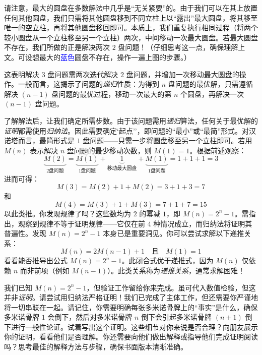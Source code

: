 \begin{center}
\end{center}

请注意，最大的圆盘在多数解法中几乎是``无关紧要''的。由于我们可以在其上放置任何其他圆盘，我们只需将其他圆盘移到不同立柱上以``露出''最大圆盘，将其移至唯一的空立柱，再将其他圆盘移回即可。本质上，我们重复执行相同过程（将两个较小圆盘从一个立柱移至另一个立柱）两次，中间移动一次最大圆盘。若最大圆盘不存在，我们所做的正是解决两次 $2$ 盘问题！（仔细思考这一点，确保理解上文。可设想最大的\textcolor{blue}{蓝色}圆盘不存在，操作一遍上图的步骤。）

这表明解决 $3$ 盘问题需两次迭代解决 $2$ 盘问题，并增加一次移动最大圆盘的操作。一般而言，这揭示了问题的\emph{递归}性质：为得到 $n$ 盘问题的最优解，只需遵循解决 $(n-1)$ 盘问题的最优过程，移动一次最大的第 $n$ 个圆盘，再解决一次 $(n-1)$ 盘问题。

了解解法后，让我们确定所需步数。由于该问题需用\emph{递归}算法，任何关于最优解的\emph{证明}都需使用\emph{归纳法}。因此需要确定`起点''，即问题的``最小''或``最简''形式。对汉诺塔而言，最简形式是 $1$ 盘问题——只需一步将圆盘移至另一个立柱即可。若用 $M(n)$ 表示解决 $n$ 盘问题的最少移动次数，则 $M(1)=1$。根据前述观察：
\[\underbrace{M(2)}_{2 \text{盘问题}}= \underbrace{M(1)}_{1 \text{盘问题}}+ \underbrace{1}_{\text{移动最大圆盘}}+ \underbrace{M(1)}_{1 \text{盘问题}}= 1 + 1 + 1 = 3\]
进而可得：
\[M(3) = M(2) + 1 + M(2) = 3 + 1 + 3 = 7\]
和
\[M(4) = M(3) + 1 + M(3) = 7 + 1 + 7 = 15\]
以此类推。你发现规律了吗？这些数均为 $2$ 的幂减 $1$，即 $M(n)=2^n-1$。需指出，观察到规律不等于证明规律——它仅在前 $4$ 种情况成立，而归纳法将证明其普遍性。发现 $M(n)=2^n-1$ 本身已是重要洞见。你可以尝试求解以下递推关系：
\[M(n) = 2M(n - 1) + 1 \quad \text{且} \quad M(1) = 1\]
看看能否推导出公式 $M(n) = 2^n -1$。此闭合式优于递推式，因为 $M(n)$ 仅依赖 $n$ 而非前项（例如 $M(n-1)$）。此类关系称为\emph{递推关系}，通常求解困难！

我们已知 $M(n)=2^n-1$，但验证工作留给你来完成。虽可代入数值检验，但这并非\emph{证明}。请尝试用归纳法严格证明！我们已完成了主体工作，但还需要你严谨地将一切串联在一起。请记住，你需要明确每张多米诺骨牌上的``事实''是什么，确保多米诺骨牌 $1$ 会倒下，然后对多米诺骨牌 $n$ 倒下会引起多米诺骨牌 $(n+1)$ 倒下进行一般性论证。试着写出这个证明。这些细节对你来说是否合理？向朋友展示你的证明，看看他们是否理解。你还需要向他们做出解释或指导他们完成证明阅读吗？思考最佳的解释方法与步骤，确保书面版本清晰准确。

\clearpage
